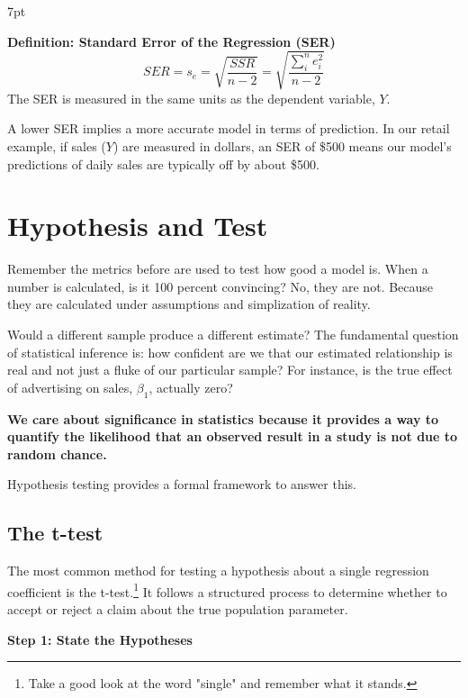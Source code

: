 \documentclass{article}
\newenvironment{greenblock}{%
\def\FrameCommand{%
  \hspace{1pt}%
    {\color{Green}%
    \vrule width 2pt}%
    {\color{greenshade}%
    \vrule width 4pt}%
  \colorbox{greenshade}%
}%
\MakeFramed{%
  \advance%
  \hsize-%
  \width%
  \FrameRestore}%
\noindent\hspace{-4.55pt}%
\begin{adjustwidth}{}{7pt}%
\vspace{2pt}\vspace{2pt}%
}
{%
\vspace{2pt}\end{adjustwidth}\endMakeFramed%
}
\begin{document}
\begin{greenblock}
\textbf{Definition: Standard Error of the Regression (SER)}
\begin{equation}
SER = s_e = \sqrt{\frac{SSR}{n-2}} = \sqrt{\frac{\sum\limits_i^n e_i^2}{n-2}}
\end{equation}
The SER is measured in the same units as the dependent variable, $Y$.
\end{greenblock}

A lower SER implies a more accurate model in terms of prediction. In our retail example, if sales ($Y$) are measured in dollars, an SER of \$500 means our model's predictions of daily sales are typically off by about \$500.




\section{Hypothesis and Test}

Remember the metrics before are used to test how good a model is. When a number is calculated, is it 100 percent convincing? No, they are not. Because they are calculated under assumptions and simplization of reality. 

Would a different sample produce a different estimate? The fundamental question of statistical inference is: how confident are we that our estimated relationship is real and not just a fluke of our particular sample? For instance, is the true effect of advertising on sales, $\beta_1$, actually zero? 

\textbf{We care about significance in statistics because it provides a way to quantify the likelihood that an observed result in a study is not due to random chance.}

Hypothesis testing provides a formal framework to answer this.

\subsection{The t-test} 

The most common method for testing a hypothesis about a {\color{red} single} regression coefficient is the t-test.\footnote{Take a good look at the word "single" and remember what it stands.} It follows a structured process to determine whether to accept or reject a claim about the true population parameter.

\textbf{Step 1: State the Hypotheses}
\end{document}
